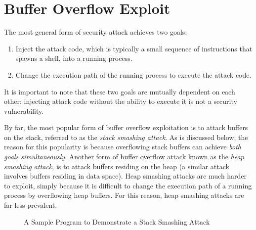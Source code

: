 \documentclass[]{article}
\newcommand{\compress}{
	\parskip 0in
	\topsep 0in
	\itemsep 0in
	\partopsep 0in
}
\newlength{\figwidth}
\begin{document}

\section{Buffer Overflow Exploit}
\label{sec:exploit}

The most general form of security attack achieves two goals:
\begin{enumerate}
\compress
\item
Inject the attack code, which is typically a small sequence of
instructions that spawns a shell, into a running process.
\item
Change the execution path of the running process to execute the attack code.
\end{enumerate}
It is important to note that these two goals are mutually dependent on
each other: injecting attack code without the ability to execute it is
not a security vulnerability.

By far, the most popular form of buffer overflow exploitation is to attack
buffers on the stack, referred to as the {\em stack smashing attack}.  As is
discussed below, the reason for this popularity is because overflowing stack
buffers can achieve {\em both goals simultaneously}.  Another form of buffer
overflow attack known as the {\em heap smashing attack}, is to attack buffers
residing on the heap (a similar attack involves buffers residing in data
space).  Heap smashing attacks are much harder to exploit, simply because it is
difficult to change the execution path of a running process by overflowing heap
buffers.  For this reason, heap smashing attacks are far less prevalent.

\begin{figure}
{\parbox {\figwidth}{}}
\caption{A Sample Program to Demonstrate a Stack Smashing Attack}
\label{fig:sample-exploit}
\end{figure}
\end{document}
